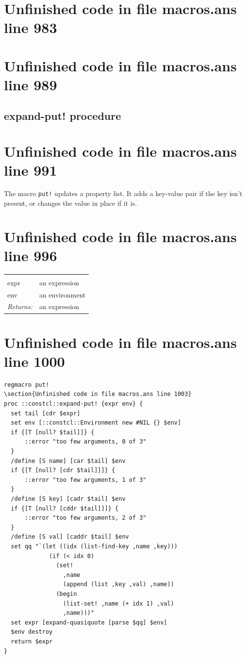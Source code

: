 \documentclass[twoside,9pt]{report}
\begin{document}
\section{Unfinished code in file macros.ans line 983}
\section{Unfinished code in file macros.ans line 989}
\subsection{expand-put! procedure}
\label{expand-put"!-procedure}
\section{Unfinished code in file macros.ans line 991}


The macro \texttt{put!} updates a property list. It adds a key-value pair if the key isn't present, or changes the value in place if it is.

\section{Unfinished code in file macros.ans line 996}
\noindent\begin{tabular}{ |p{1.9cm} p{8cm}| }
\hline
\rowcolor[HTML]{CCCCCC} \multicolumn{2}{|l|}{\bf expand-put! (internal)} \\
expr & an expression \\
env & an environment \\
\textit{Returns:} & an expression \\
\hline
\end{tabular}
\section{Unfinished code in file macros.ans line 1000}
\begin{lstlisting}
regmacro put!
\section{Unfinished code in file macros.ans line 1003}
proc ::constcl::expand-put! {expr env} {
  set tail [cdr $expr]
  set env [::constcl::Environment new #NIL {} $env]
  if {[T [null? $tail]]} {
      ::error "too few arguments, 0 of 3"
  }
  /define [S name] [car $tail] $env
  if {[T [null? [cdr $tail]]]} {
      ::error "too few arguments, 1 of 3"
  }
  /define [S key] [cadr $tail] $env
  if {[T [null? [cddr $tail]]]} {
      ::error "too few arguments, 2 of 3"
  }
  /define [S val] [caddr $tail] $env
  set qq "`(let ((idx (list-find-key ,name ,key)))
             (if (< idx 0)
               (set! 
                 ,name
                 (append (list ,key ,val) ,name))
               (begin
                 (list-set! ,name (+ idx 1) ,val)
                 ,name)))"
  set expr [expand-quasiquote [parse $qq] $env]
  $env destroy
  return $expr
}
\end{lstlisting}
\end{document}
